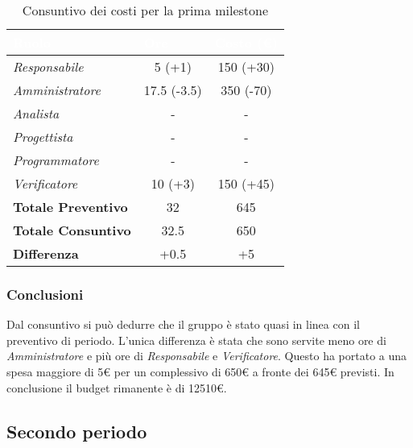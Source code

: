 \begin{table}[H]
    \renewcommand\arraystretch{1.5}
    \centering
    \begin{tabular}{|l|c|c|}
    \hline
    \rowcolor[HTML]{036400}
    \textcolor{white}{\textbf{Ruolo}} & \multicolumn{1}{l|}{\textcolor{white}{\textbf{Ore}}} & \multicolumn{1}{l|}{\textcolor{white}{\textbf{Costo (€)}}} \\ \hline
    \rowcolor[HTML]{EFEFEF}\textit{Responsabile}      & 5 (+1)    & 150 (+30) \\ \hline
    \rowcolor[HTML]{C0C0C0}\textit{Amministratore}    & 17.5 (-3.5) & 350 (-70) \\ \hline
    \rowcolor[HTML]{EFEFEF}\textit{Analista}          & -         & -         \\ \hline
    \rowcolor[HTML]{C0C0C0}\textit{Progettista}       & -         & -         \\ \hline
    \rowcolor[HTML]{EFEFEF}\textit{Programmatore}     & -         & -         \\ \hline
    \rowcolor[HTML]{C0C0C0}\textit{Verificatore}      & 10 (+3)    & 150 (+45) \\ \hline
    \rowcolor[HTML]{EFEFEF}\textbf{Totale Preventivo} & 32        & 645       \\ \hline
    \rowcolor[HTML]{C0C0C0}\textbf{Totale Consuntivo} & 32.5      & 650       \\ \hline
    \rowcolor[HTML]{EFEFEF}\textbf{Differenza}        & +0.5      & +5       \\ \hline
    \end{tabular}
    \caption{Consuntivo dei costi per la prima milestone}
\end{table}

\subsubsection{Conclusioni}
Dal consuntivo si può dedurre che il gruppo è stato quasi in linea con il preventivo di periodo.
L'unica differenza è stata che sono servite meno ore di \textit{Amministratore} e più
ore di \textit{Responsabile} e \textit{Verificatore}. Questo ha portato a una spesa maggiore di 5€ per un
complessivo di 650€ a fronte dei 645€ previsti.
In conclusione il budget rimanente è di \num{12510}€.



\subsection{Secondo periodo}

